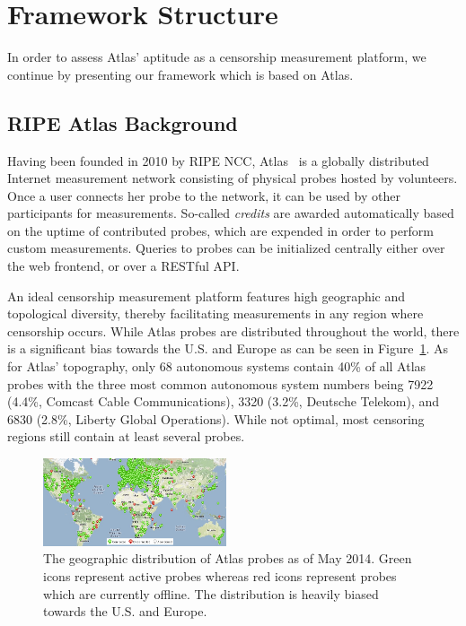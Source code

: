 \section{Framework Structure}
\label{sec:framework}
In order to assess Atlas' aptitude as a censorship measurement platform, we
continue by presenting our framework which is based on Atlas.

\subsection{RIPE Atlas Background}
Having been founded in 2010 by RIPE NCC, Atlas~\cite{atlas} is a globally
distributed Internet measurement network consisting of physical probes hosted
by volunteers.  Once a user connects her probe to the network, it can be used
by other participants for measurements. So-called \emph{credits} are awarded
automatically based on the uptime of contributed probes, which are expended in
order to perform custom measurements. Queries to probes can be initialized
centrally either over the web frontend, or over a RESTful API.

An ideal censorship measurement platform features high geographic and
topological diversity, thereby facilitating measurements in any region where
censorship occurs.  While Atlas probes are distributed throughout the world,
there is a significant bias towards the U.S. and Europe as can be seen in
Figure~\ref{fig:probe_distribution}.  As for Atlas' topography, only 68
autonomous systems contain 40\% of all Atlas probes with the three most common
autonomous system numbers being 7922 (4.4\%, Comcast Cable Communications),
3320 (3.2\%, Deutsche Telekom), and 6830 (2.8\%, Liberty Global Operations).
While not optimal, most censoring regions still contain at least several
probes.

\begin{figure}[t]
\centering
\includegraphics[width=0.48\textwidth]{diagrams/probe_distribution.jpg}
\caption{The geographic distribution of Atlas probes as of May 2014.  Green
icons represent active probes whereas red icons represent probes which are
currently offline.  The distribution is heavily biased towards the U.S. and
Europe.} \label{fig:probe_distribution}
\end{figure}


